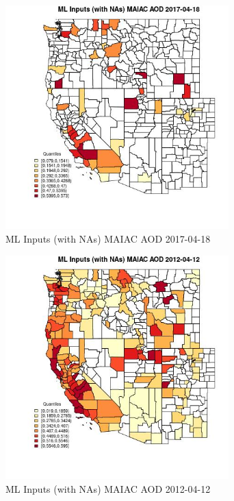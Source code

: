 \begin{figure} 
\centering  
\includegraphics[width=0.77\textwidth]{Code_Outputs/Report_ML_input_PM25_Step4_part_e_de_duplicated_aves_compiled_2019-05-14wNAs_CountyMAIAC_AODMean2017-04-18_2017-04-18.jpg} 
\caption{\label{fig:Report_ML_input_PM25_Step4_part_e_de_duplicated_aves_compiled_2019-05-14wNAsCountyMAIAC_AODMean2017-04-18_2017-04-18}ML Inputs (with NAs) MAIAC AOD 2017-04-18} 
\end{figure} 
 

\begin{figure} 
\centering  
\includegraphics[width=0.77\textwidth]{Code_Outputs/Report_ML_input_PM25_Step4_part_e_de_duplicated_aves_compiled_2019-05-14wNAs_CountyMAIAC_AODMean2012-04-12_2012-04-12.jpg} 
\caption{\label{fig:Report_ML_input_PM25_Step4_part_e_de_duplicated_aves_compiled_2019-05-14wNAsCountyMAIAC_AODMean2012-04-12_2012-04-12}ML Inputs (with NAs) MAIAC AOD 2012-04-12} 
\end{figure} 
 

